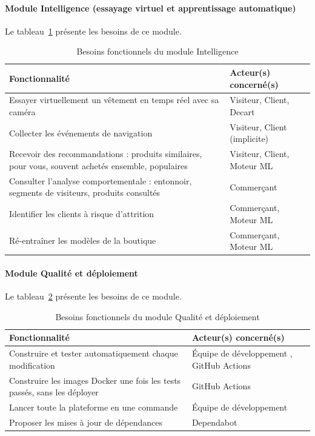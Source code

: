 \paragraph{Module Intelligence (essayage virtuel et apprentissage automatique)}
Le tableau~\ref{tab:besoins-ia} présente les besoins de ce module.
\begin{table}[H]
\centering
\renewcommand{\arraystretch}{1.3}
\begin{tabular}{|p{9.5cm}|p{5.5cm}|}
\hline
\textbf{Fonctionnalité} & \textbf{Acteur(s) concerné(s)} \\
\hline
Essayer virtuellement un vêtement en temps réel avec sa caméra & Visiteur, Client, Decart \\
\hline
Collecter les événements de navigation & Visiteur, Client (implicite) \\
\hline
Recevoir des recommandations : produits similaires, pour vous, souvent achetés ensemble, populaires & Visiteur, Client, Moteur ML \\
\hline
Consulter l'analyse comportementale : entonnoir, segments de visiteurs, produits consultés & Commerçant \\
\hline
Identifier les clients à risque d'attrition & Commerçant, Moteur ML \\
\hline
Ré-entraîner les modèles de la boutique & Commerçant, Moteur ML \\
\hline
\end{tabular}
\caption{Besoins fonctionnels du module Intelligence}
\label{tab:besoins-ia}
\end{table}

\paragraph{Module Qualité et déploiement}
Le tableau~\ref{tab:besoins-devops} présente les besoins de ce module.
\begin{table}[H]
\centering
\renewcommand{\arraystretch}{1.3}
\begin{tabular}{|p{9.5cm}|p{5.5cm}|}
\hline
\textbf{Fonctionnalité} & \textbf{Acteur(s) concerné(s)} \\
\hline
Construire et tester automatiquement chaque modification & Équipe de développement , GitHub Actions \\
\hline
Construire les images Docker une fois les tests passés, sans les déployer & GitHub Actions \\
\hline
Lancer toute la plateforme en une commande & Équipe de développement  \\
\hline
Proposer les mises à jour de dépendances & Dependabot \\
\hline
\end{tabular}
\caption{Besoins fonctionnels du module Qualité et déploiement}
\label{tab:besoins-devops}
\end{table}

